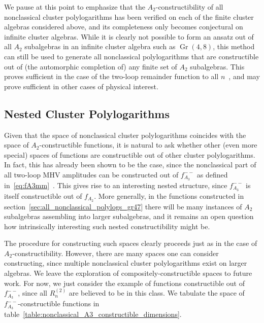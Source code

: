 \documentclass[11pt]{article}
\DeclareMathOperator{\Gr}{Gr}
\begin{document}
We pause at this point to emphasize that the $A_2$-constructibility of all nonclassical cluster polylogarithms has been verified on each of the finite cluster algebras considered above, and its completeness only becomes conjectural on infinite cluster algebras. While it is clearly not possible to form an ansatz out of all $A_2$ subalgebras in an infinite cluster algebra such as $\Gr(4,8)$, this method can still be used to generate all nonclassical polylogarithms that are constructible out of (the automorphic completion of) any finite set of $A_2$ subalgebras. This proves sufficient in the case of the two-loop remainder function to all $n$~\cite{Golden:2014xqa}, and may prove sufficient in other cases of physical interest. 

\subsection{Nested Cluster Polylogarithms}

Given that the space of nonclassical cluster polylogarithms coincides with the space of $A_2$-constructible functions, it is natural to ask whether other (even more special) spaces of functions are constructible out of other cluster polylogarithms. In fact, this has already been shown to be the case, since the nonclassical part of all two-loop MHV amplitudes can be constructed out of $f_{A_3}^{--}$ as defined in~\eqref{eq:fA3mm}~\cite{Golden:2014xqa}. This gives rise to an interesting nested structure, since $f_{A_3}^{--}$ is itself constructible out of $f_{A_2}$. More generally, in the functions constructed in section~\ref{sec:all_nonclassical_polylogs_gr47} there will be many instances of $A_2$ subalgebras assembling into larger subalgebras, and it remains an open question how intrinsically interesting such nested constructibility might be. 

The procedure for constructing such spaces clearly proceeds just as in the case of $A_2$-constructibility. However, there are many spaces one can consider constructing, since multiple nonclassical cluster polylogarithms exist on larger algebras. We leave the exploration of compositely-constructible spaces to future work. For now, we just consider the example of functions constructible out of $f_{A_3}^{--}$, since all $R_n^{(2)}$ are believed to be in this class. We tabulate the space of $f_{A_3}^{--}$-constructible functions in table~\ref{table:nonclassical_A3_constructible_dimensions}.
\end{document}
